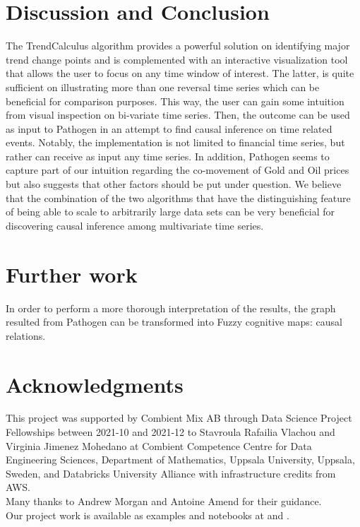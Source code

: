 \documentclass[a4, 11pt]{article}
\begin{document}
\section{Discussion and Conclusion}
The TrendCalculus algorithm provides a powerful solution on identifying major trend change points and is complemented with an interactive visualization tool that allows the user to focus on any time window of interest. The latter, is quite sufficient on illustrating more than one reversal time series which can be beneficial for comparison purposes. This way, the user can gain some intuition from visual inspection on bi-variate time series. Then, the outcome can be used as input to Pathogen in an attempt to find causal inference on time related events. Notably, the implementation is not limited to financial time series, but rather can receive as input any time series. In addition, Pathogen seems to capture part of our intuition regarding the co-movement of Gold and Oil prices but also suggests that other factors should be put under question. We believe that the combination of the two algorithms that have the distinguishing feature of being able to scale to arbitrarily large data sets can be very beneficial for discovering causal inference among multivariate time series.

\section{Further work}
In order to perform a more thorough interpretation of the results, the graph resulted from Pathogen can be transformed into Fuzzy cognitive maps: causal relations. \\


\section{Acknowledgments}
This project was supported by Combient Mix AB through Data Science Project Fellowships between 2021-10 and 2021-12 to Stavroula Rafailia Vlachou and Virginia Jimenez Mohedano at Combient Competence Centre for Data Engineering Sciences, Department of Mathematics, Uppsala University, Uppsala, Sweden, and Databricks University Alliance with infrastructure credits from AWS.\\
Many thanks to Andrew Morgan and Antoine Amend for their guidance.\\[3ex]
Our project work is available as examples and notebooks at \cite{TrendCalculusNotebooks} and \cite{PathogenNotebooks}. 

\nocite{*}
\printbibliography
\end{document}
